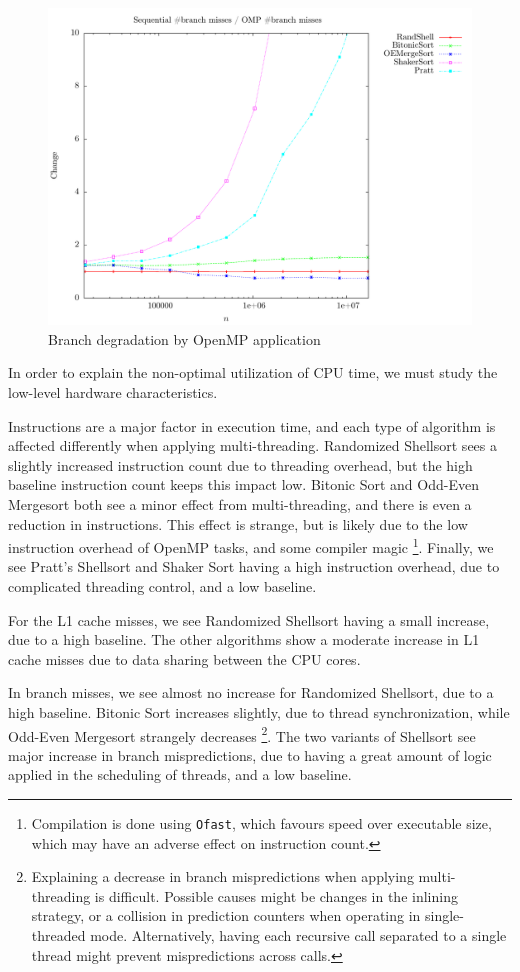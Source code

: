 \begin{figure}
\center
\includegraphics[width=\textwidth]{graphs/OMP/branchdiff.pdf}
\caption{Branch degradation by OpenMP application}
\label{fig:OMP:branchdiff}
\end{figure}

In order to explain the non-optimal utilization of CPU time, we must study the low-level hardware characteristics.

Instructions are a major factor in execution time, and each type of algorithm is affected differently when applying multi-threading.
Randomized Shellsort sees a slightly increased instruction count due to threading overhead, but the high baseline instruction count keeps this impact low. 
Bitonic Sort and Odd-Even Mergesort both see a minor effect from multi-threading, and there is even a reduction in instructions. This effect is strange, but is likely due to the low instruction overhead of OpenMP tasks, and some compiler magic
\footnote{Compilation is done using \texttt{Ofast}, which favours speed over executable size, which may have an adverse effect on instruction count.}.
Finally, we see Pratt's Shellsort and Shaker Sort having a high instruction overhead, due to complicated threading control, and a low baseline.

For the L1 cache misses, we see Randomized Shellsort having a small increase, due to a high baseline. The other algorithms show a moderate increase in L1 cache misses due to data sharing between the CPU cores.

In branch misses, we see almost no increase for Randomized Shellsort, due to a high baseline. Bitonic Sort increases slightly, due to thread synchronization, while Odd-Even Mergesort strangely decreases \footnote{
Explaining a decrease in branch mispredictions when applying multi-threading is difficult. Possible causes might be changes in the inlining strategy, or a collision in prediction counters when operating in single-threaded mode. Alternatively, having each recursive call separated to a single thread might prevent mispredictions across calls.
}. The two variants of Shellsort see major increase in branch mispredictions, due to having a great amount of logic applied in the scheduling of threads, and a low baseline.

